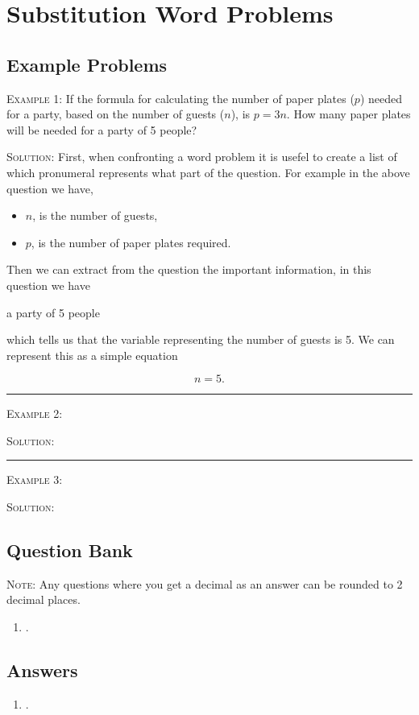 \documentclass[a4paper,12pt]{article}
\begin{document}
\large
\section*{Substitution Word Problems}

\subsection*{Example Problems}

\textsc{Example 1}: If the formula for calculating the number 
of paper plates ($p$) needed for a party, based on the 
number of guests ($n$), is $p = 3n$. How many paper plates 
will be needed for a party of 5 people?

\textsc{Solution}: First, when confronting a word problem 
it is usefel to create a list of which pronumeral represents
what part of the question. For example in the above question 
we have,

\begin{itemize}
\item $n$, is the number of guests,
\item $p$, is the number of paper plates required.
\end{itemize}

Then we can extract from the question the important
information, in this question we have 

\begin{displayquote}
a party of 5 people
\end{displayquote}

which tells us that the variable representing the number 
of guests is 5. We can represent this as a simple equation

$$n = 5.$$

\vspace{3mm}
\hrule
\vspace{3mm}

\textsc{Example 2}: 

\textsc{Solution}: 

\vspace{3mm}
\hrule
\vspace{3mm}

\textsc{Example 3}: 

\textsc{Solution}: 

\newpage
\subsection*{Question Bank}

\textsc{Note}: Any questions where you get a decimal as an answer
can be rounded to 2 decimal places.

\begin{enumerate}
\item .

\end{enumerate}

\newpage
\subsection*{Answers}

\begin{enumerate}
\item .
\end{enumerate}
\end{document}
